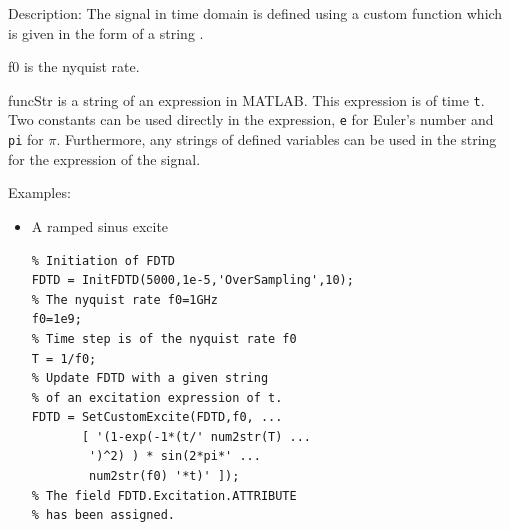 \begin{FontDescr}{Description:}
       The signal in time domain is defined using a custom function which is given in the form of a string .
    \begin{FontPara}{f0}  \label{para:customf0}
    is the nyquist rate.
    \end{FontPara}
    \begin{FontPara}{funcStr}  \label{para:funcStr}
       is a string of an expression in MATLAB. This expression is of time \texttt{t}. Two constants can be used directly in the expression, \texttt{e} for Euler's number and \texttt{pi} for $\pi$. Furthermore, any strings of defined variables can be used in the string  for the expression of the signal.
    \end{FontPara}
\end{FontDescr}

\begin{FontDescr}{Examples:}
    \begin{itemize}
\item A ramped sinus excite
\begin{lstlisting}
% Initiation of FDTD
FDTD = InitFDTD(5000,1e-5,'OverSampling',10);
% The nyquist rate f0=1GHz
f0=1e9;
% Time step is of the nyquist rate f0
T = 1/f0;
% Update FDTD with a given string
% of an excitation expression of t.
FDTD = SetCustomExcite(FDTD,f0, ...
       [ '(1-exp(-1*(t/' num2str(T) ...
        ')^2) ) * sin(2*pi*' ...
        num2str(f0) '*t)' ]);
% The field FDTD.Excitation.ATTRIBUTE
% has been assigned.
\end{lstlisting}
\end{itemize}
\end{FontDescr}